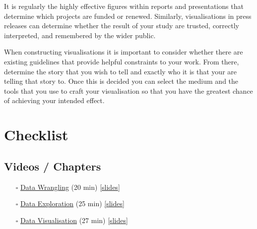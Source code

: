 \documentclass[
  letterpaper,
  DIV=11,
  numbers=noendperiod]{scrreprt}
\begin{document}
It is regularly the highly effective figures within reports and
presentations that determine which projects are funded or renewed.
Similarly, visualisations in press releases can determine whether the
result of your study are trusted, correctly interpreted, and remembered
by the wider public.

When constructing visualisations it is important to consider whether
there are existing guidelines that provide helpful constraints to your
work. From there, determine the story that you wish to tell and exactly
who it is that your are telling that story to. Once this is decided you
can select the medium and the tools that you use to craft your
visualisation so that you have the greatest chance of achieving your
intended effect.

\chapter*{Checklist}\label{edav-checklist}


\section*{Videos / Chapters}\label{videos-chapters-2}


\begin{itemize}
\item[$\square$]
  \href{https://imperial.cloud.panopto.eu/Panopto/Pages/Viewer.aspx?id=b25a6d35-1e91-4090-b4f8-af9600b39086}{Data
  Wrangling} (20 min)
  \href{https://github.com/zakvarty/effective-data-science-slides-2022/raw/main/03-01-data-wrangling/03-01-data-wrangling.pdf}{{[}slides{]}}
\item[$\square$]
  \href{https://imperial.cloud.panopto.eu/Panopto/Pages/Viewer.aspx?id=a986f50c-90fe-4379-b4a1-af9600ba22fd}{Data
  Exploration} (25 min)
  \href{https://github.com/zakvarty/effective-data-science-slides-2022/raw/main/03-02-eda/03-02-data-exploration.pdf}{{[}slides{]}}
\item[$\square$]
  \href{https://imperial.cloud.panopto.eu/Panopto/Pages/Viewer.aspx?id=2ebbfa94-0b5d-45e9-b708-af8100d9664a}{Data
  Visualisation} (27 min)
  \href{https://github.com/zakvarty/effective-data-science-slides-2022/raw/main/03-03-data-visualisation/03-03-data-visualisation.pdf}{{[}slides{]}}
\end{itemize}
\end{document}
